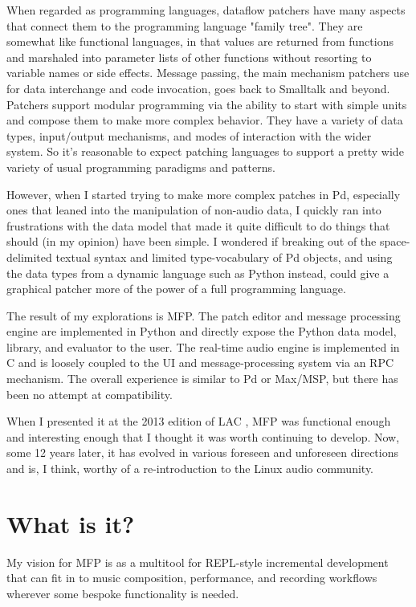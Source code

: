 \documentclass[a4paper]{article}
\def\:{\hskip0pt}
\begin{document}
When regarded as programming languages, dataflow patchers have
many aspects that connect them to the programming language
"family tree".  They are somewhat like functional languages,
in that values are returned from functions and marshaled into
parameter lists of other functions without resorting to variable
names or side effects.  Message passing, the main mechanism
patchers use for data interchange and code invocation, goes back
to Smalltalk and beyond. Patchers support modular programming
via the ability to start with simple units and compose them to
make more complex behavior. They have a variety of data types,
input/output mechanisms, and modes of interaction with the wider
system. So it's reasonable to expect patching languages to
support a pretty wide variety of usual programming paradigms and
patterns.

However, when I started trying to make more complex patch\-es in
Pd, especially ones that leaned into the manipulation of
non\:-\:audio data, I quickly ran into frustrations with the data
model that made it quite difficult to do things that should (in
my opinion) have been simple. I wondered if breaking out of the
space\:-\:delimited textual syntax and limited type\:-\:vocabulary of Pd
objects, and using the data types from a dynamic language such as
Python instead, could give a graphical patcher more of the power
of a full programming language.

The result of my explorations is MFP. The patch editor and
message processing engine are implemented in Python and directly
expose the Python data model, library, and evaluator to the user.
The real\:-\:time audio engine is implemented in C and is loosely
coupled to the UI and message\:-\:processing system via an RPC
mechanism. The overall experience is similar to Pd or Max/MSP,
but there has been no attempt at compatibility.

When I presented it at the 2013 edition of LAC
\cite{Gribble:2013}, MFP was functional enough and interesting
enough that I thought it was worth continuing to develop. Now,
some 12 years later, it has evolved in various foreseen and
unforeseen directions and is, I think, worthy of a
re\:-\:introduction to the Linux audio community.


\section{What is it?}

My vision for MFP is as a multitool for REPL\:-\:style incremental
development that can fit in to music composition, performance,
and recording workflows wherever some bespoke functionality is
needed.
\end{document}
